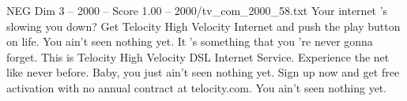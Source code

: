 \begin{textsample}{NEG Dim 3 – 2000 – Score 1.00 – 2000/tv\_com\_2000\_58.txt}  \label{ex:f3_neg_016}
Your internet 's slowing you down?
Get Telocity High Velocity Internet and push the play button on life.
You ain't seen nothing yet.
It 's something that you 're never gonna forget.
This is Telocity High Velocity DSL Internet Service.
Experience the net like never before.
Baby, you just ain't seen nothing yet.
Sign up now and get free activation with no annual contract at telocity.com.
You ain't seen nothing yet.

\end{textsample}
